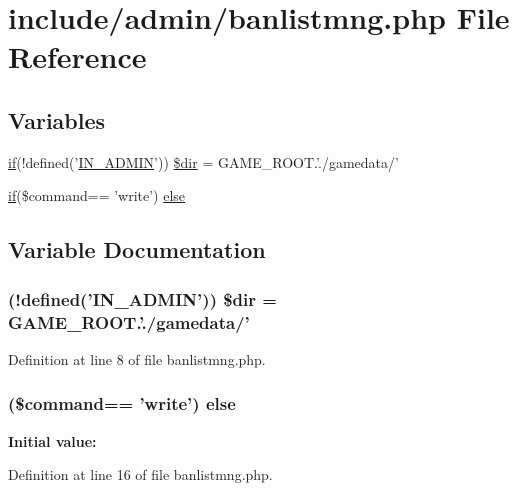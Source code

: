 \hypertarget{banlistmng_8php}{\section{include/admin/banlistmng.php File Reference}
\label{banlistmng_8php}
}
\subsection*{Variables}
\begin{DoxyCompactItemize}
\item 
\hyperlink{login__old_8php_a4ac1118c2e44c513a674bc1793ba6c90}{if}(!defined('\hyperlink{admin_8php_ad49472b0cdee543164375bf133a537f1}{I\+N\+\_\+\+A\+D\+M\+I\+N}')) \hyperlink{banlistmng_8php_a4ea59ac1af06e5429e6fd50f000152b3}{\$dir} = G\+A\+M\+E\+\_\+\+R\+O\+O\+T.'./gamedata/'
\item 
\hyperlink{login__old_8php_a4ac1118c2e44c513a674bc1793ba6c90}{if}(\$command== 'write') \hyperlink{banlistmng_8php_a4aa8bc93e3935826786807ba931fd1e5}{else}
\end{DoxyCompactItemize}


\subsection{Variable Documentation}
\hypertarget{banlistmng_8php_a4ea59ac1af06e5429e6fd50f000152b3}{
\subsubsection[{\$dir}]{ (!defined('{\bf I\+N\+\_\+\+A\+D\+M\+I\+N}')) \$dir = G\+A\+M\+E\+\_\+\+R\+O\+O\+T.'./gamedata/'}}\label{banlistmng_8php_a4ea59ac1af06e5429e6fd50f000152b3}


Definition at line 8 of file banlistmng.\+php.

\hypertarget{banlistmng_8php_a4aa8bc93e3935826786807ba931fd1e5}{
\subsubsection[{else}]{ (\$command== 'write') else}}\label{banlistmng_8php_a4aa8bc93e3935826786807ba931fd1e5}
{\bfseries Initial value\+:}


Definition at line 16 of file banlistmng.\+php.

